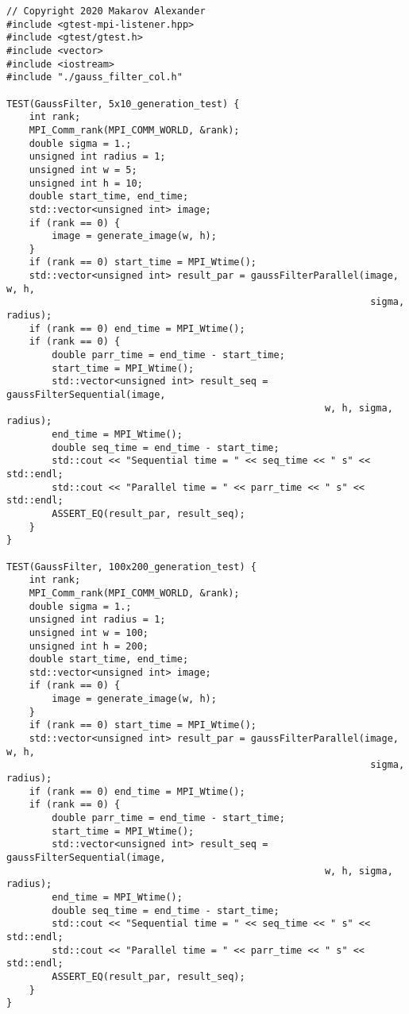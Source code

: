 \documentclass{report}
\begin{document}
\begin{lstlisting}
// Copyright 2020 Makarov Alexander
#include <gtest-mpi-listener.hpp>
#include <gtest/gtest.h>
#include <vector>
#include <iostream>
#include "./gauss_filter_col.h"

TEST(GaussFilter, 5x10_generation_test) {
    int rank;
    MPI_Comm_rank(MPI_COMM_WORLD, &rank);
    double sigma = 1.;
    unsigned int radius = 1;
    unsigned int w = 5;
    unsigned int h = 10;
    double start_time, end_time;
    std::vector<unsigned int> image;
    if (rank == 0) {
        image = generate_image(w, h);
    }
    if (rank == 0) start_time = MPI_Wtime();
    std::vector<unsigned int> result_par = gaussFilterParallel(image, w, h,
                                                                sigma, radius);
    if (rank == 0) end_time = MPI_Wtime();
    if (rank == 0) {
        double parr_time = end_time - start_time;
        start_time = MPI_Wtime();
        std::vector<unsigned int> result_seq = gaussFilterSequential(image,
                                                        w, h, sigma, radius);
        end_time = MPI_Wtime();
        double seq_time = end_time - start_time;
        std::cout << "Sequential time = " << seq_time << " s" << std::endl;
        std::cout << "Parallel time = " << parr_time << " s" << std::endl;
        ASSERT_EQ(result_par, result_seq);
    }
}

TEST(GaussFilter, 100x200_generation_test) {
    int rank;
    MPI_Comm_rank(MPI_COMM_WORLD, &rank);
    double sigma = 1.;
    unsigned int radius = 1;
    unsigned int w = 100;
    unsigned int h = 200;
    double start_time, end_time;
    std::vector<unsigned int> image;
    if (rank == 0) {
        image = generate_image(w, h);
    }
    if (rank == 0) start_time = MPI_Wtime();
    std::vector<unsigned int> result_par = gaussFilterParallel(image, w, h,
                                                                sigma, radius);
    if (rank == 0) end_time = MPI_Wtime();
    if (rank == 0) {
        double parr_time = end_time - start_time;
        start_time = MPI_Wtime();
        std::vector<unsigned int> result_seq = gaussFilterSequential(image,
                                                        w, h, sigma, radius);
        end_time = MPI_Wtime();
        double seq_time = end_time - start_time;
        std::cout << "Sequential time = " << seq_time << " s" << std::endl;
        std::cout << "Parallel time = " << parr_time << " s" << std::endl;
        ASSERT_EQ(result_par, result_seq);
    }
}


\end{lstlisting}
\end{document}
